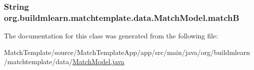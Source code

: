 \subsubsection[{\texorpdfstring{matchB}{matchB}}]{\setlength{\rightskip}{0pt plus 5cm}String org.\+buildmlearn.\+matchtemplate.\+data.\+Match\+Model.\+matchB\hspace{0.3cm}{\ttfamily [private]}}\hypertarget{classorg_1_1buildmlearn_1_1matchtemplate_1_1data_1_1MatchModel_a1a2f1713037995453966d237102d0554}{}\label{classorg_1_1buildmlearn_1_1matchtemplate_1_1data_1_1MatchModel_a1a2f1713037995453966d237102d0554}


The documentation for this class was generated from the following file\+:\begin{DoxyCompactItemize}
\item 
Match\+Template/source/\+Match\+Template\+App/app/src/main/java/org/buildmlearn/matchtemplate/data/\hyperlink{MatchModel_8java}{Match\+Model.\+java}\end{DoxyCompactItemize}
